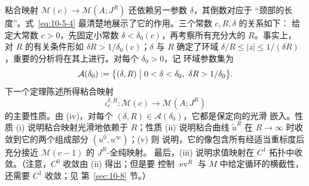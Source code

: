 粘合映射 $\mathcal M(c)\to\mathcal M(A;J^R)$ 还依赖另一参数 $\delta$，其倒数对应于
“颈部的长度”。式~\eqref{eq:10-5-4} 最清楚地展示了它的作用。三个常数 $c,R,\delta$ 的关系如下：
给定大常数 $c>0$，先固定小常数 $\delta<\delta_0(c)$，再考察所有充分大的 $R$。事实上，
对 $R$ 的有关条件形如 $\delta R>1/\delta_0(c)$；$\delta$ 与 $R$ 确定了环域
$\delta/R\le|z|\le1/(\delta R)$，重要的分析将在其上进行。对每个 $\delta_0>0$，记
环域参数集为
\begin{equation}\label{eq:10-1-5}
  \mathcal A(\delta_0)
  :=\bigl\{(\delta,R)\bigm|0<\delta<\delta_0,\ \delta R>1/\delta_0\bigr\}.
\end{equation}
下一个定理陈述所得粘合映射
\[
  \iota_c^{\delta,R}:\mathcal M(c)\longrightarrow\mathcal M(A;J^R)
\]
的主要性质。由 (iv)，对每个 $(\delta,R)\in\mathcal A(\delta_0)$，它都是保定向的光滑
嵌入。性质 (i) 说明粘合映射光滑地依赖于 $R$；性质 (ii) 说明粘合曲线
$\widetilde u^R$ 在 $R\to\infty$ 时收敛到它的两个组成部分 $(u^0,u^\infty)$；(v) 则
说明，它的像包含所有经适当重标度后充分接近 $\mathcal M(c-1)$ 的 $J^R$-全纯映射。
最后，(iii) 说明求值映射在 $C^1$ 拓扑中收敛。（注意，$C^0$ 收敛由 (ii) 得出；但是要
控制 $\operatorname{ev}^R$ 与 $M$ 中给定循环的横截性，还需要 $C^1$ 收敛；见
第~\ref{sec:10-8} 节。）

